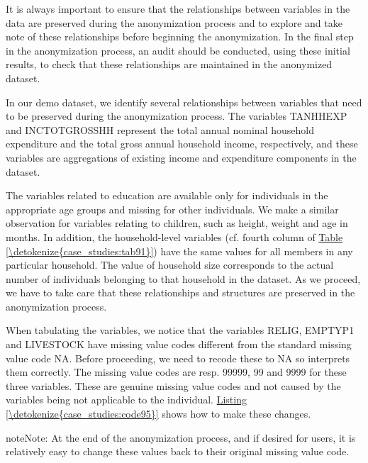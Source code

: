 \documentclass[letterpaper,10pt,english]{sphinxmanual}
\begin{document}
It is always important to ensure that the relationships between
variables in the data are preserved during the anonymization process and
to explore and take note of these relationships before beginning the
anonymization. In the final step in the anonymization process, an audit
should be conducted, using these initial results, to check that these
relationships are maintained in the anonymized dataset.

In our demo dataset, we identify several relationships between variables
that need to be preserved during the anonymization process. The
variables TANHHEXP and INCTOTGROSSHH represent the total annual nominal
household expenditure and the total gross annual household income,
respectively, and these variables are aggregations of existing income
and expenditure components in the dataset.

The variables related to education are available only for individuals in
the appropriate age groups and missing for other individuals. We make a
similar observation for variables relating to children, such as height,
weight and age in months. In addition, the household-level variables
(cf. fourth column of \hyperref[\detokenize{case_studies:tab91}]{Table \ref{\detokenize{case_studies:tab91}}}) have the same values for all members in
any particular household. The value of household size corresponds to the
actual number of individuals belonging to that household in the dataset.
As we proceed, we have to take care that these relationships and
structures are preserved in the anonymization process.

When tabulating the variables, we notice that the variables RELIG,
EMPTYP1 and LIVESTOCK have missing value codes different from the 
standard missing value code NA. Before proceeding, we need to recode
these to NA so  interprets them correctly. The missing value codes
are resp. 99999, 99 and 9999 for these three variables. These are
genuine missing value codes and not caused by the variables being not
applicable to the individual. \hyperref[\detokenize{case_studies:code95}]{Listing \ref{\detokenize{case_studies:code95}}} shows how to make these
changes.

\begin{sphinxadmonition}{note}{Note:}
At the end of the anonymization process, and if desired
for users, it is relatively easy to change these values back to their
original missing value code.
\end{sphinxadmonition}
\end{document}
